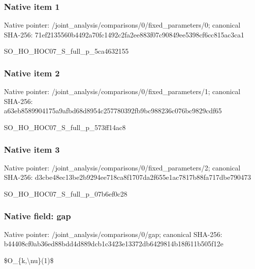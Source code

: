 \documentclass[10pt,a4paper]{article}
\begin{document}
\subsubsection{Native item 1}
Native pointer: /joint\_\allowbreak{}analysis/comparisons/0/fixed\_\allowbreak{}parameters/0; canonical SHA-256: 71ef2135560b4492a70fc1492c2fa2ee883f07c90849ee5398cf6cc815ac3ca1

\begingroup\raggedright\sloppy SO\_\allowbreak{}HO\_\allowbreak{}HOC07\_\allowbreak{}S\_\allowbreak{}full\_\allowbreak{}p\_\allowbreak{}5ca4632155\par\endgroup

\subsubsection{Native item 2}
Native pointer: /joint\_\allowbreak{}analysis/comparisons/0/fixed\_\allowbreak{}parameters/1; canonical SHA-256: a63eb8589904175a9afbd68d8954c257780392fb9bc988236c076bc9829cdf65

\begingroup\raggedright\sloppy SO\_\allowbreak{}HO\_\allowbreak{}HOC07\_\allowbreak{}S\_\allowbreak{}full\_\allowbreak{}p\_\allowbreak{}573ff14ac8\par\endgroup

\subsubsection{Native item 3}
Native pointer: /joint\_\allowbreak{}analysis/comparisons/0/fixed\_\allowbreak{}parameters/2; canonical SHA-256: d3cbe48ec13be2b9294ee718ca8f1707da2f655e1ac7817b88fa717dbe790473

\begingroup\raggedright\sloppy SO\_\allowbreak{}HO\_\allowbreak{}HOC07\_\allowbreak{}S\_\allowbreak{}full\_\allowbreak{}p\_\allowbreak{}07b6ef0c28\par\endgroup

\subsubsection{Native field: gap}
Native pointer: /joint\_\allowbreak{}analysis/comparisons/0/gap; canonical SHA-256: b44408cf0ab36ed88bdd4d889dcb1c3423e13372db6429814b18f611b505f12e

\begingroup\raggedright\sloppy \$O\_\allowbreak{}\{k,\allowbreak{}\textbackslash{}nu\}(1)\$\par\endgroup
\end{document}
